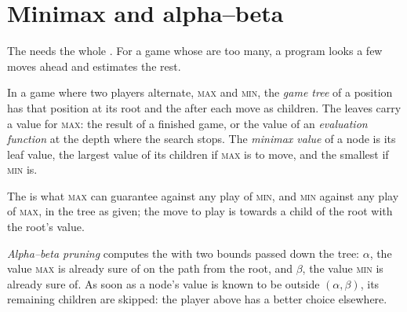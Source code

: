 \section{Minimax and alpha--beta}\label{sec:b2:search-and-games:minimax}

The  needs the whole . For a game whose  are too many, a program looks a few moves ahead and
estimates the rest.

\begin{definition}\label{def:b2:search-and-games:minimax}
In a game where two players alternate, \textsc{max} and \textsc{min}, the \emph{game tree} of a position
has that position at its root and the  after each move as children. The leaves carry a value for \textsc{max}:
the result of a finished game, or the value of an \emph{evaluation function} at the depth
where the search stops. The \emph{minimax value} of a node is its leaf value, the largest value of
its children if \textsc{max} is to move, and the smallest if \textsc{min} is.
\end{definition}

The  is what \textsc{max} can guarantee against any play of \textsc{min}, and \textsc{min} against any play
of \textsc{max}, in the tree as given; the move to play is towards a child of the root with the root's value.

\begin{definition}\label{def:b2:search-and-games:alpha-beta}
\emph{Alpha--beta pruning} computes the  with two bounds passed down the tree:
$\alpha$, the value \textsc{max} is already sure of on the path from the root, and $\beta$, the value \textsc{min} is
already sure of. As soon as a node's value is known to be outside $(\alpha, \beta)$, its remaining children are skipped:
the player above has a better choice elsewhere.
\end{definition}

\label{lst:b2:search-and-games:alphabeta}

